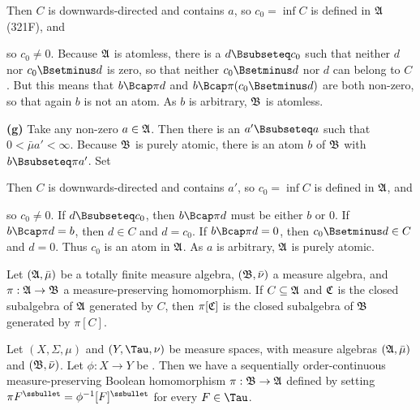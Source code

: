 {
     
\noindent Then $C$ is downwards-directed and contains $a$, so
$c_0=\inf C$ is defined in $\frak A$ (321F), and
     
     
\noindent so $c_0\ne 0$.   Because $\frak A$ is atomless, there is a
$d\Bsubseteq c_0$ such that neither $d$ nor $c_0\Bsetminus d$ is zero,
so that neither $c_0\Bsetminus d$ nor $d$ can belong to $C$.  But this
means that $b\Bcap\pi d$ and $b\Bcap\pi(c_0\Bsetminus d)$ are both
non-zero, so that again $b$ is not an atom.
As $b$ is arbitrary, $\frak B$ is atomless.
     
\medskip
     
{\bf (g)} Take any non-zero $a\in\frak A$.   Then there is an
$a'\Bsubseteq a$ such that $0<\bar\mu a'<\infty$.   Because $\frak B$ is
purely atomic, there is an atom $b$ of $\frak B$ with $b\Bsubseteq\pi
a'$.   Set
     
     
\noindent Then $C$ is downwards-directed and contains $a'$, so $c_0=\inf
C$ is defined in $\frak A$, and
     
     
\noindent so $c_0\ne 0$.  If $d\Bsubseteq c_0$, then $b\Bcap \pi d$ must
be either $b$ or $0$.   If $b\Bcap\pi d=b$, then $d\in C$ and $d=c_0$.
If $b\Bcap\pi d=0$, then $c_0\Bsetminus d\in C$ and $d=0$.   Thus $c_0$
is an atom in $\frak A$.   As $a$ is arbitrary, $\frak A$ is purely
atomic.
}%
     
 Let $(\frak A,\bar\mu)$ be a totally finite
measure algebra, $(\frak B,\bar\nu)$ a measure algebra, and
$\pi:\frak A\to\frak B$
a measure-preserving homomorphism.   If $C\subseteq\frak A$ and
$\frak C$ is the closed subalgebra of $\frak A$ generated by $C$, then
$\pi[\frak C]$ is the closed subalgebra of $\frak B$ generated by
$\pi[C]$.
     
     
 Let $(X,\Sigma,\mu)$ and $(Y,\Tau,\nu)$ be
measure spaces, with measure algebras $(\frak A,\bar\mu)$ and
$(\frak B,\bar\nu)$.   Let $\phi:X\to Y$ be \imp.   
Then we have a sequentially order-continuous measure-preserving Boolean
homomorphism $\pi:\frak B\to\frak A$ defined by setting
$\pi F^{\ssbullet}=\phi^{-1}[F]^{\ssbullet}$ for every $F\in\Tau$.
     
